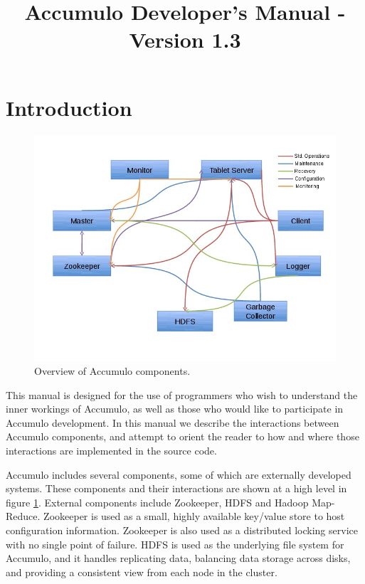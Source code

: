 \documentclass[letterpaper,onecolumn,12pt,titlepage]{article}
\title{Accumulo Developer's Manual - Version 1.3}
\author{}
\begin{document}
\maketitle
\newpage
\tableofcontents
\newpage
\section{Introduction}

\begin{figure}[htbp]
\center
\includegraphics[scale=.6]{images/component_overview.jpg}
\caption{\label{fig_overview} Overview of Accumulo components.}
\end{figure}
This manual is designed for the use of programmers who wish to understand the inner workings of Accumulo, as well as those who would like to participate in Accumulo development.
In this manual we describe the interactions between Accumulo components, and attempt to orient the reader to how and where those interactions are implemented in the source code.

Accumulo includes several components, some of which are externally developed systems.
These components and their interactions are shown at a high level in figure \ref{fig_overview}.
External components include Zookeeper, HDFS and Hadoop Map-Reduce.
Zookeeper is used as a small, highly available key/value store to host configuration information.
Zookeeper is also used as a distributed locking service with no single point of failure.
HDFS is used as the underlying file system for Accumulo, and it handles replicating data, balancing data storage across disks, and providing a consistent view from each node in the cluster.
\end{document}
